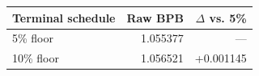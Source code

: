 \begin{tabular}{lrr}
\toprule
Terminal schedule & Raw BPB & $\Delta$ vs. 5\% \\
\midrule
5\% floor & 1.055377 & --- \\
10\% floor & 1.056521 & +0.001145 \\
\bottomrule
\end{tabular}
